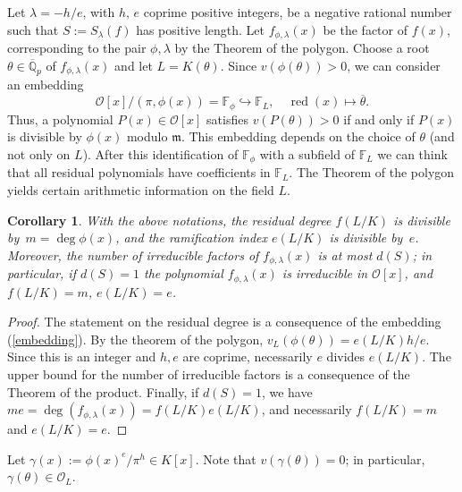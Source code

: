 \documentclass{amsart}
\newtheorem{corollary}[theorem]{Corollary}
\def\op{\operatorname}
\def\dg{\op{deg}}
\def\ff#1{\mathbb{F}_{#1}}
\def\fph{\mathbb{F}_{\phi}}
\def\ga{\gamma}
\def\la{\lambda}
\def\m{{\mathfrak m}}
\def\ol{{\mathcal O}_L}
\def\oo{{\mathcal O}}
\def\qpb{\overline{\mathbb{Q}}_p}
\def\rd{\op{red}}
\def\t{\theta}
\def\tb{\overline{\theta}}
\def\zpx{\oo[x]}
\begin{document}
Let $\la=-h/e$, with $h,\,e$ coprime positive integers, be a negative rational number such that $S:=S_{\la}(f)$ has positive length. Let $f_{\phi,\la}(x)$ be the factor of $f(x)$, corres\-ponding to the pair $\phi,\la$ by the Theorem of the polygon. Choose a root $\t\in\qpb$ of $f_{\phi,\la}(x)$ and let $L=K(\t)$. Since $v(\phi(\t))>0$, we can consider an embedding 
\begin{equation}\label{embedding}
 \zpx/(\pi,\phi(x))=\fph\hookrightarrow \ff{L},\quad \rd(x)\mapsto \tb.
\end{equation}
Thus, a polynomial $P(x)\in\zpx$ satisfies $v(P(\t))>0$ if and only if $P(x)$ is divisible by $\phi(x)$ modulo $\m$. 
This embedding depends on the choice of $\t$ (and not only on $L$). After this identification of $\fph$ with a subfield of $\ff{L}$ we can think that all residual polynomials have coefficients in $\ff{L}$. The Theorem of the polygon yields certain arithmetic information on the field $L$.

\begin{corollary}\label{ram}
With the above notations, the residual degree $f(L/K)$ is divisible by $\,m=\deg \phi(x)$, and the ramification index $e(L/K)$ is divisible by $\,e$.
Moreover, the number of irreducible factors of $f_{\phi,\la}(x)$ is at most $d(S)$; in particular, if $d(S)=1$ the polynomial $f_{\phi,\la}(x)$ is irreducible in $\zpx$, and $f(L/K)=m$, $e(L/K)=e$.
\end{corollary}

\begin{proof}
The statement on the residual degree is a consequence of the embedding (\ref{embedding}). By the theorem of the polygon,
$v_L(\phi(\t))=e(L/K)h/e$. Since this is an integer and $h,e$ are coprime, ne\-cessarily $e$ divides $e(L/K)$. The upper bound for the number of irreducible factors is a consequence of the Theorem of the product. Finally, if $d(S)=1$, we have $me=\dg(f_{\phi,\la}(x))=f(L/K)e(L/K)$, and necessarily $f(L/K)=m$ and $e(L/K)=e$. 
\end{proof}

Let $\ga(x):=\phi(x)^e/\pi^h\in K[x]$. Note that $v(\ga(\t))=0$; in particular, $\ga(\t)\in \ol$.
\end{document}
